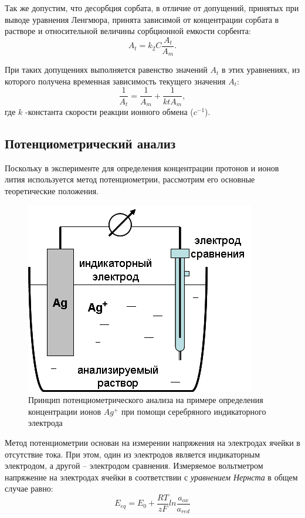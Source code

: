 \documentclass[a4paper,12pt]{article} %
\begin{document}
Так же допустим, что десорбция сорбата, в отличие от допущений, принятых при выводе уравнения Ленгмюра, принята зависимой от концентрации сорбата в растворе и относительной величины сорбционной емкости сорбента:
\begin{equation*}
     A_t = k_2C\frac{A_t}{A_m}.
\end{equation*}

При таких допущениях выполняется равенство значений $A_t$ в этих уравнениях, из которого получена временная зависимость текущего значения $A_t$:
\begin{equation}
    \frac{1}{A_t} = \frac{1}{A_m} + \frac{1}{ktA_m},
    \label{eq:leng}
\end{equation}
где $k$ -константа скорости реакции ионного обмена ($c^{-1}$).

\subsection{Потенциометрический анализ}Поскольку в эксперименте для определения концентрации протонов и ионов лития используется метод потенциометрии, рассмотрим его основные теоретические положения. 

\begin{figure}[H]
    \centering
    \includegraphics[scale=1]{потенц.png}
    \caption{Принцип потенциометрического анализа на примере определения концентрации ионов $Ag^{+}$ при помощи серебряного индикаторного электрода 
}
    \label{pic:00}
\end{figure}

Метод потенциометрии основан на измерении напряжения на электродах ячейки в отсутствие тока. При этом, один из электродов является индикаторным электродом, а другой – электродом сравнения. Измеряемое вольтметром напряжение на электродах ячейки в соответствии с \textit{уравнением Нернста} в общем случае равно: 
\begin{equation}
    E_{eq} = E_0 +\frac{RT}{zF}ln\frac{a_{ox}}{a_{red}}
\end{equation}
\end{document}
